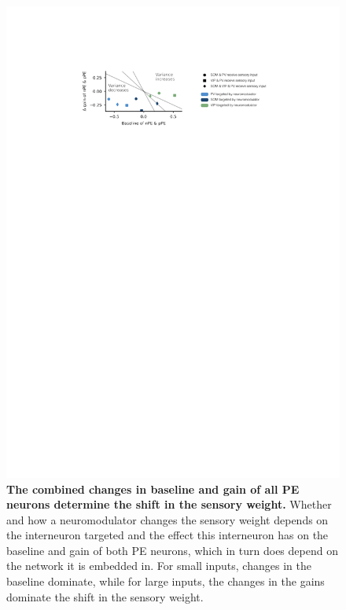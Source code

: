 \documentclass[10pt,a4paper]{article}
\begin{document}
\begin{figure}[!h]
	\centering
    \includegraphics{../results/figures/final/Fig_4_S4}%
\caption{\footnotesize{\bf The combined changes in baseline and gain of all PE neurons determine the shift in the sensory weight.\newline}  
Whether and how a neuromodulator changes the sensory weight depends on the interneuron targeted and the effect this interneuron has on the baseline and gain of both PE neurons, which in turn does depend on the network it is embedded in. For small inputs, changes in the baseline dominate, while for large inputs, the changes in the gains dominate the shift in the sensory weight.
}
\label{fig:Fig_4_S4}
\end{figure}
\end{document}
